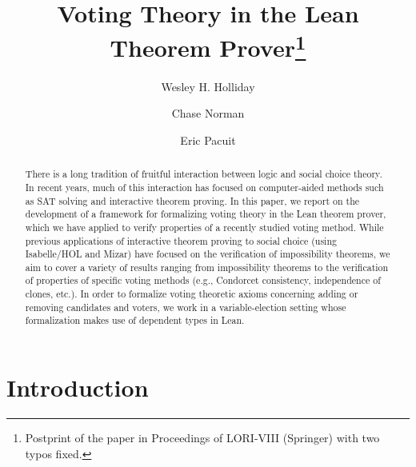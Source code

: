 \documentclass[runningheads]{llncs}
\begin{document}
%
\title{Voting Theory in the Lean Theorem Prover\thanks{Postprint of the paper in Proceedings of LORI-VIII (Springer) with two typos fixed.}}


%
\author{Wesley H. Holliday \and
Chase Norman \and
Eric Pacuit}
%
%
%
\maketitle              %
%
\begin{abstract}
There is a long tradition of fruitful interaction between logic and social choice theory. In recent years, much of this interaction has focused on computer-aided methods such as SAT solving and interactive theorem proving. In this paper, we report on the development of a framework for formalizing voting theory in the Lean theorem prover, which we have applied to verify properties of a recently studied voting method. While previous  applications of interactive theorem proving to social choice (using Isabelle/HOL and Mizar) have focused on the verification of impossibility theorems, we aim to cover a variety of results ranging from impossibility theorems to the verification of properties of specific voting methods (e.g., Condorcet consistency, independence of clones, etc.). In order to formalize voting theoretic axioms concerning adding or removing candidates and voters, we work in a variable-election setting whose formalization makes use of dependent types in Lean.

\end{abstract}

\section{Introduction}
\end{document}
